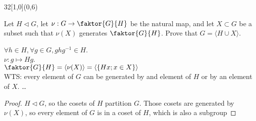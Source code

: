\documentclass[12pt]{article}
\newenvironment{exercise}[2]{\begin{textblock}{32}[1,0](0,#2)\noindent#1\end{textblock}}{\vspace{1in}}
\newtheorem*{lemma}{Lemma}
\begin{document}

\begin{exercise}{2.40}{6}
	{\noindent}Let $H\vartriangleleft G$, let $\nu:G\to \faktor{G}{H}$ be the natural map, and let $X\subset G$ be a subset such that $\nu(X)$ generates $\faktor{G}{H}$. Prove that $G=\langle H\cup X\rangle$.
	\bigskip

	{\noindent}$\forall h\in H, \forall g\in G, ghg^{-1}\in H$.\\
	$\nu: g\mapsto Hg$.\\
	$\faktor{G}{H}=\langle\nu(X)\rangle=\langle\{Hx; x\in X\}\rangle$\\
	WTS: every element of $G$ can be generated by and element of $H$ or by an element of $X$.
	\dots

	\begin{proof}
		$H\vartriangleleft G$, so the cosets of $H$ partition $G$. Those cosets are generated by $\nu(X)$, so every element of $G$ is in a coset of $H$, which is also a subgroup
	\end{proof}
\end{exercise}

%
%
%
\end{document}
